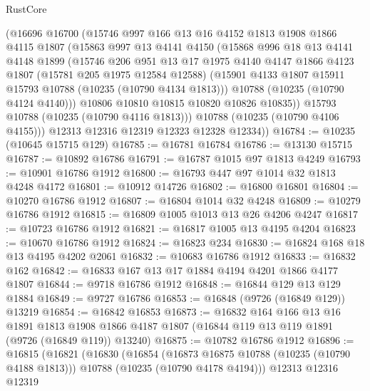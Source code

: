 \begin{lexlean}{RustCore}
\begin{coremodule}
        (@16696
          @16700
          (@15746
            @997
            @166
            @13
            @16
            @4152
            @1813
            @1908
            @1866
            @4115
            @1807
            (@15863
              @997
              @13
              @4141
              @4150
              (@15868
                @996
                @18
                @13
                @4141
                @4148
                @1899
                (@15746
                  @206
                  @951
                  @13
                  @17
                  @1975
                  @4140
                  @4147
                  @1866
                  @4123
                  @1807
                  (@15781 @205 @1975 @12584 @12588)
                  (@15901 @4133 @1807 @15911 @15793 @10788 (@10235 (@10790 @4134 @1813)))
                  @10788
                  (@10235 (@10790 @4124 @4140)))
                @10806
                @10810
                @10815
                @10820
                @10826
                @10835))
            @15793
            @10788
            (@10235 (@10790 @4116 @1813)))
          @10788
          (@10235 (@10790 @4106 @4155)))
        @12313
        @12316
        @12319
        @12323
        @12328
        @12334))
@16784 := @10235 (@10645 @15715 @129)
@16785 := @16781 @16784
@16786 := @13130 @15715
@16787 := @10892 @16786
@16791 := @16787 @1015 @97 @1813 @4249
@16793 := @10901 @16786 @1912
@16800 := @16793 @447 @97 @1014 @32 @1813 @4248 @4172
@16801 := @10912 @14726
@16802 := @16800 @16801
@16804 := @10270 @16786 @1912
@16807 := @16804 @1014 @32 @4248
@16809 := @10279 @16786 @1912
@16815 := @16809 @1005 @1013 @13 @26 @4206 @4247
@16817 := @10723 @16786 @1912
@16821 := @16817 @1005 @13 @4195 @4204
@16823 := @10670 @16786 @1912
@16824 := @16823 @234
@16830 := @16824 @168 @18 @13 @4195 @4202 @2061
@16832 := @10683 @16786 @1912
@16833 := @16832 @162
@16842 := @16833 @167 @13 @17 @1884 @4194 @4201 @1866 @4177 @1807
@16844 := @9718 @16786 @1912
@16848 := @16844 @129 @13 @129 @1884
@16849 := @9727 @16786
@16853 := @16848 (@9726 (@16849 @129)) @13219
@16854 := @16842 @16853
@16873 := @16832
    @164
    @166
    @13
    @16
    @1891
    @1813
    @1908
    @1866
    @4187
    @1807
    (@16844 @119 @13 @119 @1891 (@9726 (@16849 @119)) @13240)
@16875 := @10782 @16786 @1912
@16896 := @16815
    (@16821
      (@16830
        (@16854
          (@16873 @16875 @10788 (@10235 (@10790 @4188 @1813)))
          @10788
          (@10235 (@10790 @4178 @4194)))
        @12313
        @12316
        @12319

\end{coremodule}
\end{lexlean}
